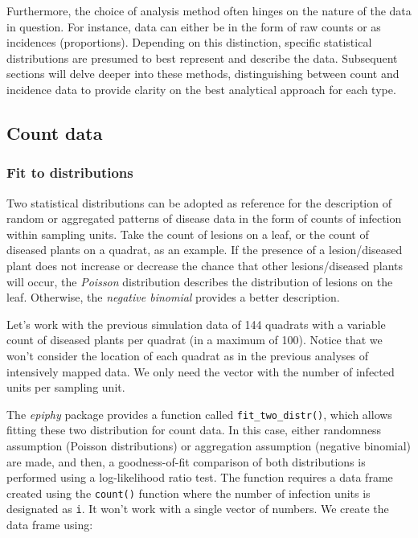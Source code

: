 \documentclass[
  letterpaper,
]{book}
\begin{document}
Furthermore, the choice of analysis method often hinges on the nature of
the data in question. For instance, data can either be in the form of
raw counts or as incidences (proportions). Depending on this
distinction, specific statistical distributions are presumed to best
represent and describe the data. Subsequent sections will delve deeper
into these methods, distinguishing between count and incidence data to
provide clarity on the best analytical approach for each type.

\hypertarget{count-data}{%
\subsection{Count data}\label{count-data}}

\hypertarget{fit-to-distributions}{%
\subsubsection{Fit to distributions}\label{fit-to-distributions}}

Two statistical distributions can be adopted as reference for the
description of random or aggregated patterns of disease data in the form
of counts of infection within sampling units. Take the count of lesions
on a leaf, or the count of diseased plants on a quadrat, as an example.
If the presence of a lesion/diseased plant does not increase or decrease
the chance that other lesions/diseased plants will occur, the
\emph{Poisson} distribution describes the distribution of lesions on the
leaf. Otherwise, the \emph{negative binomial} provides a better
description.

Let's work with the previous simulation data of 144 quadrats with a
variable count of diseased plants per quadrat (in a maximum of 100).
Notice that we won't consider the location of each quadrat as in the
previous analyses of intensively mapped data. We only need the vector
with the number of infected units per sampling unit.

The \emph{epiphy} package provides a function called
\texttt{fit\_two\_distr()}, which allows fitting these two distribution
for count data. In this case, either randomness assumption (Poisson
distributions) or aggregation assumption (negative binomial) are made,
and then, a goodness-of-fit comparison of both distributions is
performed using a log-likelihood ratio test. The function requires a
data frame created using the \texttt{count()} function where the number
of infection units is designated as \texttt{i}. It won't work with a
single vector of numbers. We create the data frame using:
\end{document}
